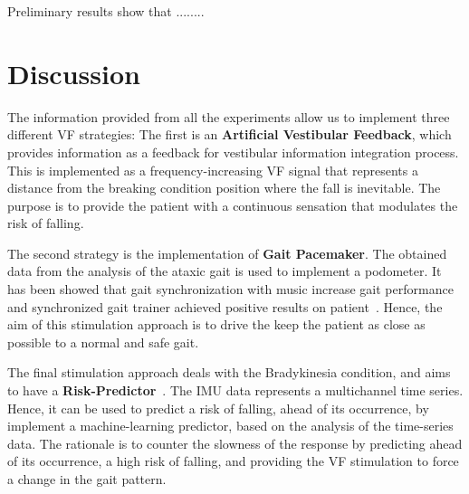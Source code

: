 \documentclass[conference]{IEEEtran}
\begin{document}
Preliminary results show that ........

%
%
%

\section*{Discussion}

The information provided from all the experiments allow us to implement three different VF strategies:  The first is an \textbf{Artificial Vestibular Feedback}, which provides information as a feedback for vestibular information integration process.  This is implemented as a frequency-increasing VF signal that represents a distance from the breaking condition position where the fall is inevitable.   The purpose is to provide the patient with a continuous sensation that modulates the risk of falling.

The second strategy is the implementation of \textbf{Gait Pacemaker}.  The obtained data from the analysis of the ataxic gait is used to implement a podometer.  It has been showed that gait synchronization with music increase gait performance~\cite{Roerdink.etal2007} and synchronized gait trainer achieved positive results on patient~\cite{Blicher.etal2009}.  Hence, the aim of this stimulation approach is to drive the keep the patient as close as possible to a normal and safe gait.

The final stimulation approach deals with the Bradykinesia condition, and aims to have a \textbf{Risk-Predictor}~\cite{Rahman.etal2022,Ali.etal2022}.  The IMU data  represents a multichannel time series.  Hence, it can be used to predict a risk of falling, ahead of its occurrence, by implement a machine-learning predictor, based on the analysis of the time-series data.  The rationale is to counter the slowness of the response by predicting ahead of its occurrence, a high risk of falling, and providing the VF stimulation to force a change in the gait pattern.
\end{document}
